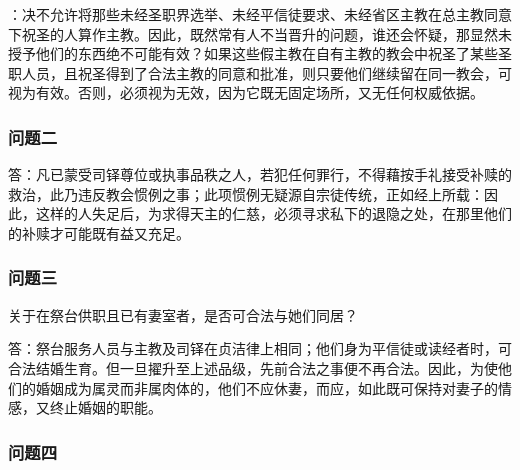 \par

：决不允许将那些未经圣职界选举、未经平信徒要求、未经省区主教在总主教同意下祝圣的人算作主教。因此，既然常有人不当晋升的问题，谁还会怀疑，那显然未授予他们的东西绝不可能有效？如果这些假主教在自有主教的教会中祝圣了某些圣职人员，且祝圣得到了合法主教的同意和批准，则只要他们继续留在同一教会，可视为有效。否则，必须视为无效，因为它既无固定场所，又无任何权威依据。\par


\subsubsection{问题二}

\par

答：凡已蒙受司铎尊位或执事品秩之人，若犯任何罪行，不得藉按手礼接受补赎的救治，此乃违反教会惯例之事；此项惯例无疑源自宗徒传统，正如经上所载：因此，这样的人失足后，为求得天主的仁慈，必须寻求私下的退隐之处，在那里他们的补赎才可能既有益又充足。\par


\subsubsection{问题三}

关于在祭台供职且已有妻室者，是否可合法与她们同居？\par

答：祭台服务人员与主教及司铎在贞洁律上相同；他们身为平信徒或读经者时，可合法结婚生育。但一旦擢升至上述品级，先前合法之事便不再合法。因此，为使他们的婚姻成为属灵而非属肉体的，他们不应休妻，而应，如此既可保持对妻子的情感，又终止婚姻的职能。\par


\subsubsection{问题四}

